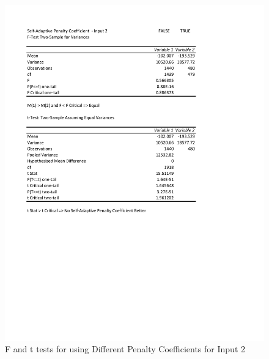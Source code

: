 \documentclass[times]{article}
\begin{document}
	\begin{figure}
		\caption{F and t tests for using Different Penalty Coefficients for Input 2}
		\label{fig:coeff2}
		\includegraphics[width=\textwidth]{./t_test/S-APenaltyCoeff2}
	\end{figure}
\end{document}
